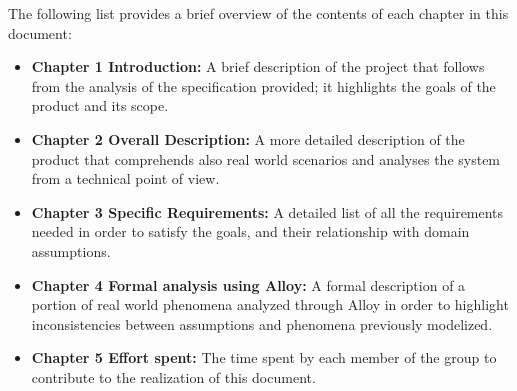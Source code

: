 The following list provides a brief overview of the contents of each chapter in this document:

\begin{itemize}
    \item \textbf{Chapter 1 Introduction:} A brief description of the project that follows from the analysis of the specification provided; it highlights the goals of the product and its scope.
    
    \item \textbf{Chapter 2 Overall Description:} A more detailed description of the product that comprehends also real world scenarios and analyses the system from a technical point of view.
    
    \item \textbf{Chapter 3 Specific Requirements:} A detailed list of all the requirements needed in order to satisfy the goals, and their relationship with domain assumptions.
    
    \item \textbf{Chapter 4 Formal analysis using Alloy:} A formal description of a portion of real world phenomena analyzed through Alloy in order to highlight inconsistencies between assumptions and phenomena previously modelized.
    
    \item \textbf{Chapter 5 Effort spent:} The time spent by each member of the group to contribute to the realization of this document.
\end{itemize}